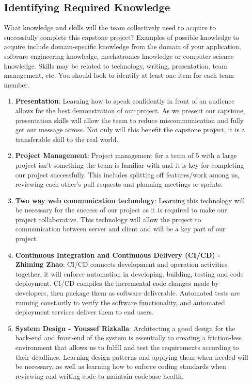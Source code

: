 \documentclass[12pt, titlepage]{article}
\begin{document}

\subsection{Identifying Required Knowledge}

What knowledge and skills will the team collectively need to acquire to successfully complete this capstone project? Examples of possible knowledge to acquire include domain-specific knowledge from the domain of your application, software engineering knowledge, mechatronics knowledge or computer science knowledge. Skills may be related to technology, writing, presentation, team management, etc. You should look to identify at least one item for each team member.

\begin{enumerate}

\item  \textbf{Presentation}:
Learning how to speak confidently in front of an audience allows for the best demonstration of our project. As we present our capstone, presentation skills will allow the team to reduce miscommunication and fully get our message across. Not only will this benefit the capstone project, it is a transferable skill to the real world. 

\item  \textbf{Project Management}:
Project management for a team of 5 with a large project isn't something the team is familiar with and it is key for completing our project successfully. This includes splitting off features/work among us, reviewing each other's pull requests and planning meetings or sprints.

\item \textbf{Two way web communication technology}: Learning this technology will be necessary for the success of our project as it is required to make our project collaborative. This technology will allow the project to communication between server and client and will be a key part of our project.

\item  \textbf{Continuous Integration and Continuous Delivery (CI/CD) - Zhiming Zhao}:
CI/CD connects development and operation activities together, it will enforce automation in developing, building, testing and code deployment. CI/CD compiles the incremental code changes made by developers, then package them as software deliverable. Automated tests are running constantly to verify the software functionality, and automated deployment services deliver them to end users. 

\item \textbf{System Design - Youssef Rizkalla}: 
Architecting a good design for the back-end and front-end of the system is essentially to creating a friction-less environment that allows us to fulfill and test the requirements according to their deadlines. Learning design patterns and applying them when needed will be necessary, as well as learning how to enforce coding standards when reviewing and writing code to maintain codebase health.

\end{enumerate}
\end{document}
